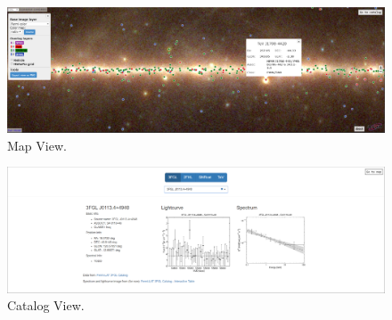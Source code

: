 \begin{figure}[h]
  \centerline{\includegraphics[width=\textwidth]{figures/mapview_wide}}
  \caption{Map View.}
\end{figure}

\begin{figure}[h]
  \centerline{\includegraphics[width=\textwidth]{figures/catview_wide}}
  \caption{Catalog View.}
\end{figure}
